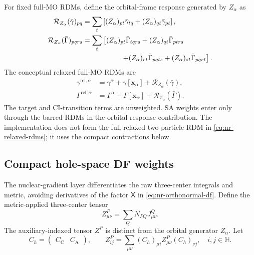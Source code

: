\documentclass[aip,preprint,nofootinbib]{revtex4-1}
\newcommand{\core}{\mathrm{C}}
\newcommand{\act}{\mathrm{A}}
\begin{document}
For fixed full-MO RDMs, define the orbital-frame response generated by
$Z_\alpha$ as
\begin{align}
 \mathcal R_{Z_\alpha}(\bar\gamma)_{pq}
 &=\sum_t\left[(Z_\alpha)_{pt}\bar\gamma_{tq}
              +(Z_\alpha)_{qt}\bar\gamma_{pt}\right],
 \\
 \mathcal R_{Z_\alpha}(\bar\Gamma)_{pqrs}
 &=\sum_t\left[(Z_\alpha)_{pt}\bar\Gamma_{tqrs}
              +(Z_\alpha)_{qt}\bar\Gamma_{ptrs}
 \right.\nonumber\\
 &\hspace{5.5em}\left.
              +(Z_\alpha)_{rt}\bar\Gamma_{pqts}
              +(Z_\alpha)_{st}\bar\Gamma_{pqrt}\right].
 \label{eq:nr-orbital-rdm-response}
\end{align}
The conceptual relaxed full-MO RDMs are
\begin{align}
 \gamma^{\mathrm{rel},\alpha}
 &=\gamma^\alpha+\gamma[\mathbf x_\alpha]
  +\mathcal R_{Z_\alpha}(\bar\gamma),
 \\
 \Gamma^{\mathrm{rel},\alpha}
 &=\Gamma^\alpha+\Gamma[\mathbf x_\alpha]
  +\mathcal R_{Z_\alpha}(\bar\Gamma).
 \label{eq:nr-relaxed-rdms}
\end{align}
The target and CI-transition terms are unweighted.  SA weights enter only
through the barred RDMs in the orbital-response contribution.  The
implementation does not form the full relaxed two-particle RDM in
\cref{eq:nr-relaxed-rdms}; it uses the compact contractions below.

\subsection{Compact hole-space DF weights}

The nuclear-gradient layer differentiates the raw three-center integrals and
metric, avoiding derivatives of the factor $\mathsf X$ in
\cref{eq:nr-orthonormal-df}.  Define the metric-applied three-center tensor
\begin{equation}
 Z^P_{\mu\nu}=\sum_QN_{PQ}J^Q_{\mu\nu}.
 \label{eq:nr-metric-applied-df}
\end{equation}
The auxiliary-indexed tensor $Z^P$ is distinct from the orbital generator
$Z_\alpha$.  Let
\begin{equation}
 C_h=\begin{pmatrix}C_{\core}&C_{\act}\end{pmatrix},
 \qquad
 Z^P_{ij}=\sum_{\mu\nu}(C_h)_{\mu i}
 Z^P_{\mu\nu}(C_h)_{\nu j},
 \quad i,j\in\mathbb H.
 \label{eq:nr-hole-df}
\end{equation}
\end{document}
